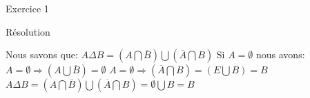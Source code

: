 \hypertarget{Exercice_1}{
\Huge{\begin{center}Exercice 1\end{center} \leavevmode\newline }}

\hypertarget{resolution}{%
\LARGE{Résolution}\label{resolution}}
\newline
\newline
Nous savons que:
\newline
\newline
$A \Delta B = (A \bigcap \overline{B}) \bigcup (\overline{A} \bigcap B)$
\newline
\newline
Si $A = \emptyset$ nous avons:
\newline
\newline
$A = \emptyset \Rightarrow (A \bigcup \overline{B}) = \emptyset$
\newline
$A = \emptyset \Rightarrow (\overline{A} \bigcap B) = (E \bigcup B) = B$
\newline
$A \Delta B = (A \bigcap \overline{B}) \bigcup (\overline{A} \bigcap B) = \emptyset \bigcup B = B$
